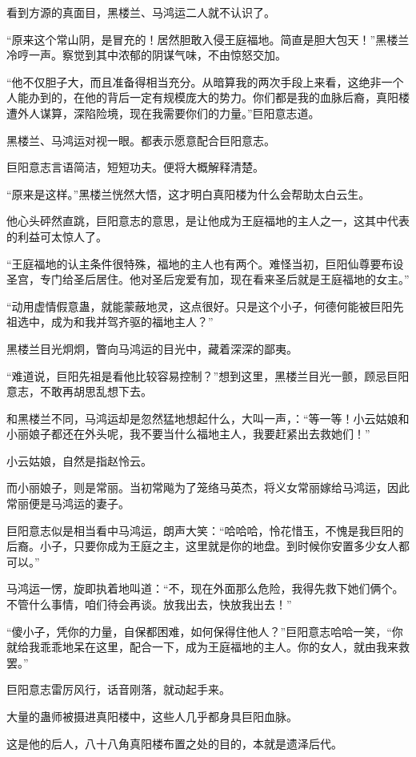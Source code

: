 \begin{this_body}
看到方源的真面目，黑楼兰、马鸿运二人就不认识了。

“原来这个常山阴，是冒充的！居然胆敢入侵王庭福地。简直是胆大包天！”黑楼兰冷哼一声。察觉到其中浓郁的阴谋气味，不由惊怒交加。

“他不仅胆子大，而且准备得相当充分。从暗算我的两次手段上来看，这绝非一个人能办到的，在他的背后一定有规模庞大的势力。你们都是我的血脉后裔，真阳楼遭外人谋算，深陷险境，现在我需要你们的力量。”巨阳意志道。

黑楼兰、马鸿运对视一眼。都表示愿意配合巨阳意志。

巨阳意志言语简洁，短短功夫。便将大概解释清楚。

“原来是这样。”黑楼兰恍然大悟，这才明白真阳楼为什么会帮助太白云生。

他心头砰然直跳，巨阳意志的意思，是让他成为王庭福地的主人之一，这其中代表的利益可太惊人了。

“王庭福地的认主条件很特殊，福地的主人也有两个。难怪当初，巨阳仙尊要布设圣宫，专门给圣后居住。他对圣后宠爱有加，现在看来圣后就是王庭福地的女主。”

“动用虚情假意蛊，就能蒙蔽地灵，这点很好。只是这个小子，何德何能被巨阳先祖选中，成为和我并驾齐驱的福地主人？”

黑楼兰目光炯炯，瞥向马鸿运的目光中，藏着深深的鄙夷。

“难道说，巨阳先祖是看他比较容易控制？”想到这里，黑楼兰目光一颤，顾忌巨阳意志，不敢再胡思乱想下去。

和黑楼兰不同，马鸿运却是忽然猛地想起什么，大叫一声，：“等一等！小云姑娘和小丽娘子都还在外头呢，我不要当什么福地主人，我要赶紧出去救她们！”

小云姑娘，自然是指赵怜云。

而小丽娘子，则是常丽。当初常飚为了笼络马英杰，将义女常丽嫁给马鸿运，因此常丽便是马鸿运的妻子。

巨阳意志似是相当看中马鸿运，朗声大笑：“哈哈哈，怜花惜玉，不愧是我巨阳的后裔。小子，只要你成为王庭之主，这里就是你的地盘。到时候你安置多少女人都可以。”

马鸿运一愣，旋即执着地叫道：“不，现在外面那么危险，我得先救下她们俩个。不管什么事情，咱们待会再谈。放我出去，快放我出去！”

“傻小子，凭你的力量，自保都困难，如何保得住他人？”巨阳意志哈哈一笑，“你就给我乖乖地呆在这里，配合一下，成为王庭福地的主人。你的女人，就由我来救罢。”

巨阳意志雷厉风行，话音刚落，就动起手来。

大量的蛊师被摄进真阳楼中，这些人几乎都身具巨阳血脉。

这是他的后人，八十八角真阳楼布置之处的目的，本就是遗泽后代。


\end{this_body}
